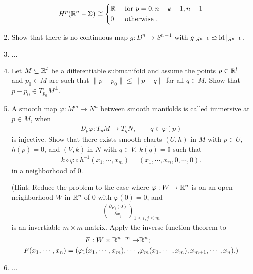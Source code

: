 \begin{enumerate}[\theexercise.1.]
\begin{align*}
      H^p(\mathbb{R}^n-\Sigma) \cong \left\{\begin{aligned}
        & \mathbb{R} && \text{ for } p=0, n-k-1, n-1 \\
        & 0 && \text{ otherwise }.
      \end{aligned}\right.
    \end{align*}
  \item Show that there is no continuous map $g:D^n\to S^{n-1}$ with $g|_{S^{n-1}}\backsimeq \operatorname{id}|_{S^{n-1}}$.
  \item ... \setcounter{exercise}{9}\setcounter{enumi}{0}
  \item \label{exercise:9-1} Let $M\subseteq\mathbb{R}^l$ be a differentiable submanifold and assume the points 
    $p\in \mathbb{R}^l$ and $p_0\in M$ are such that $\|p-p_0\|\le \|p-q\|$ for all $q\in M$. Show that 
    $p-p_0\in T_{p_0}M^\perp$.
  \item A smooth map $\varphi:M^m\to N^n$ between smooth manifolds is called immersive at $p\in M$, when 
    \begin{align*}
      D_p\varphi:T_pM\to T_{q}N, \qquad q\in\varphi(p)
    \end{align*}
    is injective. Show that there exists smooth charts $(U, h)$ in $M$ with $p\in U$, $h(p)=0$, and 
    $(V, k)$ in $N$ with $q\in V$, $k(q)=0$ such that 
    \begin{align*}
      k\circ\varphi\circ h^{-1}(x_1, \cdots, x_m) = (x_1, \cdots, x_m, 0, \cdots, 0).
    \end{align*}
    in a neighborhood of 0.\par
    (Hint: Reduce the problem to the case where $\varphi:W\to\mathbb{R}^n$ is on an open neighborhood $W$ in $\mathbb{R}^n$
    of 0 with $\varphi(0) = 0$, and 
    \begin{align*}
      \left(\frac{\partial \varphi_i(0)}{\partial x_j}\right)_{1\le i,j\le m}
    \end{align*}
    is an invertiable $m\times m$ matrix. Apply the inverse function theorem to 
    \begin{align*}
      F:W\times \mathbb{R}^{n-m}\to&\mathbb{R}^n;\\
      F(x_1, \cdots, x_n) 
        = (
            \varphi_1(x_1, \cdots, x_m), 
            \cdots, 
            & \varphi_m(x_1, \cdots, x_m), 
            x_{m+1}, 
            \cdots, 
            x_n
            ).)
    \end{align*}
  \item ... 
\end{enumerate}